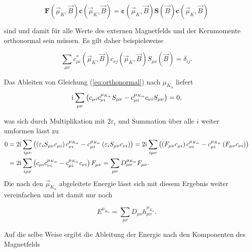     \begin{equation}\label{eq:modscf}
	  \boldsymbol{F}(\vec{\mu}_K,\vec{B})\boldsymbol{c}(\vec{\mu}_K,\vec{B})=\boldsymbol{\varepsilon}(\vec{\mu}_K,\vec{B})\boldsymbol{S}(\vec{B})\boldsymbol{c}(\vec{\mu}_K,\vec{B})
	\end{equation}
	 
	sind und damit für alle Werte des externen Magnetfelds und der Kernmomente orthonormal sein müssen. Es gilt daher beispielsweise
	
	\begin{equation}\label{eq:orthonormal}
	\sum_{\mu\nu}c_{\mu i}^*(\vec{\mu}_K,\vec{B})c_{\nu j}(\vec{\mu}_K,\vec{B})S_{\mu\nu}(\vec{B})=\delta_{ij}.
	\end{equation}
	
	Das Ableiten von Gleichung (\ref{eq:orthonormal}) nach $\mu_{K_\alpha}$ liefert
	\begin{equation}
	\mathrm{i}\mkern1mu\sum_{\mu\nu}\left(c_{\mu i}c_{\nu i}^{\mu_{K_\alpha}}S_{\mu\nu}-c_{\mu i}^{\mu_{K_\alpha}}c_{\nu i}S_{\mu\nu}\right)=0,
	\end{equation}
	
	was sich durch Multiplikation mit $2\varepsilon_i$ und Summation über alle $i$ weiter umformen lässt zu
	\begin{equation}
	\begin{aligned}
	0&=2\mathrm{i}\mkern1mu\sum_{i\mu\nu}\left(\left(\varepsilon_i S_{\mu\nu} c_{\mu i}\right) c_{\nu i}^{\mu_{K_\alpha}} - c_{\mu i}^{\mu_{K_\alpha}} \left(\varepsilon_i S_{\mu\nu} c_{\nu i}\right)\right)=2\mathrm{i}\mkern1mu\sum_{i\mu\nu}\left(\left(F_{\mu\nu} c_{\mu i}\right) c_{\nu i}^{\mu_{K_\alpha}} - c_{\mu i}^{\mu_{K_\alpha}} \left(F_{\mu\nu} c_{\nu i} \right)\right)\\
	&=2\mathrm{i}\mkern1mu\sum_{i\mu\nu}\left(c_{\mu i}c_{\nu i}^{\mu_{K_\alpha}}-c_{\mu i}^{\mu_{K_\alpha}}c_{\nu i}\right)F_{\mu\nu}=\sum_{\mu\nu}D_{\mu\nu}^{\mu_{K_\alpha}}F_{\mu\nu}.
	\end{aligned}
	\end{equation}
	Die nach den $\vec{\mu}_{K_\alpha}$ abgeleitete Energie lässt sich mit diesem Ergebnis weiter vereinfachen und ist damit nur noch 
	
	\begin{equation}\label{eq:enachmukurz}
	E^{\mu_{K_\alpha}}=\sum_{\mu\nu}D_{\mu\nu}h_{\mu\nu}^{\mu_{K_\alpha}}.
	\end{equation}
	
	Auf die selbe Weise ergibt die Ableitung der Energie nach den Komponenten des Magnetfelds
	
